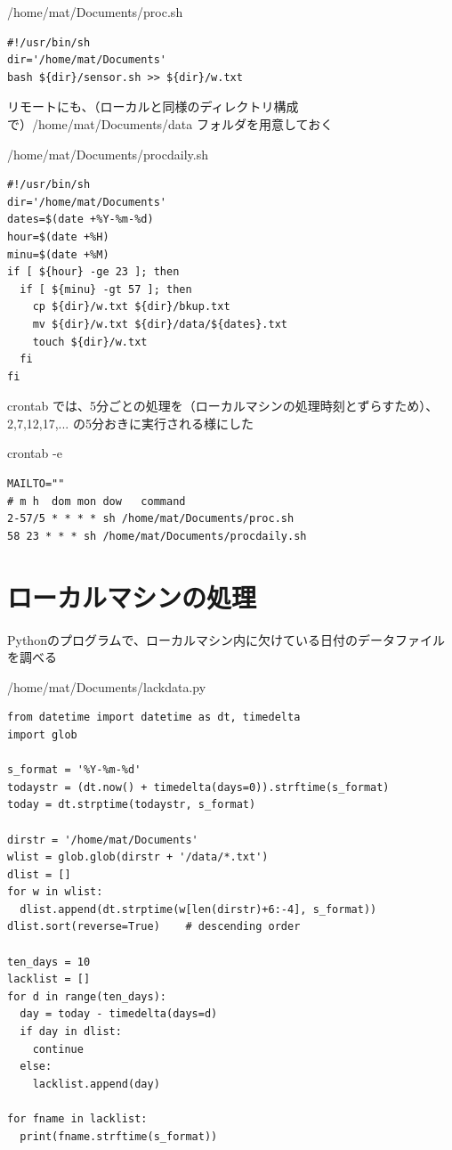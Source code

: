 \documentclass[12pt,a4paper,uplatex]{jsbook}
\begin{document}
\begin{itembox}[l]{/home/mat/Documents/proc.sh}
	\begin{verbatim}
#!/usr/bin/sh
dir='/home/mat/Documents'
bash ${dir}/sensor.sh >> ${dir}/w.txt
	\end{verbatim}
\end{itembox}

リモートにも、（ローカルと同様のディレクトリ構成で）/home/mat/Documents/data フォルダを用意しておく

\begin{itembox}[l]{/home/mat/Documents/procdaily.sh}
	\begin{verbatim}
#!/usr/bin/sh
dir='/home/mat/Documents'
dates=$(date +%Y-%m-%d)
hour=$(date +%H)
minu=$(date +%M)
if [ ${hour} -ge 23 ]; then
  if [ ${minu} -gt 57 ]; then
    cp ${dir}/w.txt ${dir}/bkup.txt
    mv ${dir}/w.txt ${dir}/data/${dates}.txt
    touch ${dir}/w.txt
  fi
fi
	\end{verbatim}
\end{itembox}

crontab では、5分ごとの処理を（ローカルマシンの処理時刻とずらすため）、2,7,12,17,... の5分おきに実行される様にした

\begin{itembox}[l]{crontab -e}
\begin{verbatim}
MAILTO=""
# m h  dom mon dow   command
2-57/5 * * * * sh /home/mat/Documents/proc.sh
58 23 * * * sh /home/mat/Documents/procdaily.sh
\end{verbatim}	
\end{itembox}

\newpage

\section{ローカルマシンの処理}

Pythonのプログラムで、ローカルマシン内に欠けている日付のデータファイルを調べる

\begin{itembox}[l]{/home/mat/Documents/lackdata.py}
	\begin{verbatim}
from datetime import datetime as dt, timedelta
import glob

s_format = '%Y-%m-%d'
todaystr = (dt.now() + timedelta(days=0)).strftime(s_format)
today = dt.strptime(todaystr, s_format)

dirstr = '/home/mat/Documents'
wlist = glob.glob(dirstr + '/data/*.txt')
dlist = []
for w in wlist:
  dlist.append(dt.strptime(w[len(dirstr)+6:-4], s_format))
dlist.sort(reverse=True)	# descending order

ten_days = 10
lacklist = []
for d in range(ten_days):
  day = today - timedelta(days=d)
  if day in dlist:
    continue
  else:
    lacklist.append(day)

for fname in lacklist:
  print(fname.strftime(s_format))
	\end{verbatim}
\end{itembox}
\end{document}

